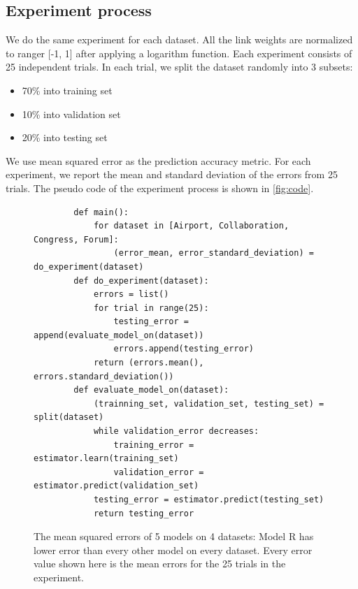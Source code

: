 \documentclass[conference]{IEEEtran}
\begin{document}
\subsection{Experiment process}
We do the same experiment for each dataset.
All the link weights are normalized to ranger [-1, 1] after applying a logarithm function.
Each experiment consists of 25 independent trials.
In each trial, we split the dataset randomly into 3 subsets:
\begin{itemize}
	\item 70\% into training set
	\item 10\% into validation set
	\item 20\% into testing set
\end{itemize}
We use mean squared error as the prediction accuracy metric.
For each experiment, we report the mean and standard deviation of the errors from 25 trials.
The pseudo code of the experiment process is shown in \autoref{fig:code}.
\begin{figure}[!htb]\centering
	\begin{lstlisting}
		def main():
			for dataset in [Airport, Collaboration, Congress, Forum]:
				(error_mean, error_standard_deviation) = do_experiment(dataset)
		def do_experiment(dataset):
			errors = list()
			for trial in range(25):
				testing_error = append(evaluate_model_on(dataset))
				errors.append(testing_error)
			return (errors.mean(), errors.standard_deviation())
		def evaluate_model_on(dataset):
			(trainning_set, validation_set, testing_set) = split(dataset)
			while validation_error decreases:
				training_error = estimator.learn(training_set)
				validation_error = estimator.predict(validation_set)
			testing_error = estimator.predict(testing_set)
			return testing_error
	\end{lstlisting}
	\caption{
		The mean squared errors of 5 models on 4 datasets:
		Model R has lower error than every other model on every dataset.
		Every error value shown here is the mean errors for the 25 trials in the experiment.
	}
	\label{fig:code}
\end{figure}
\end{document}
